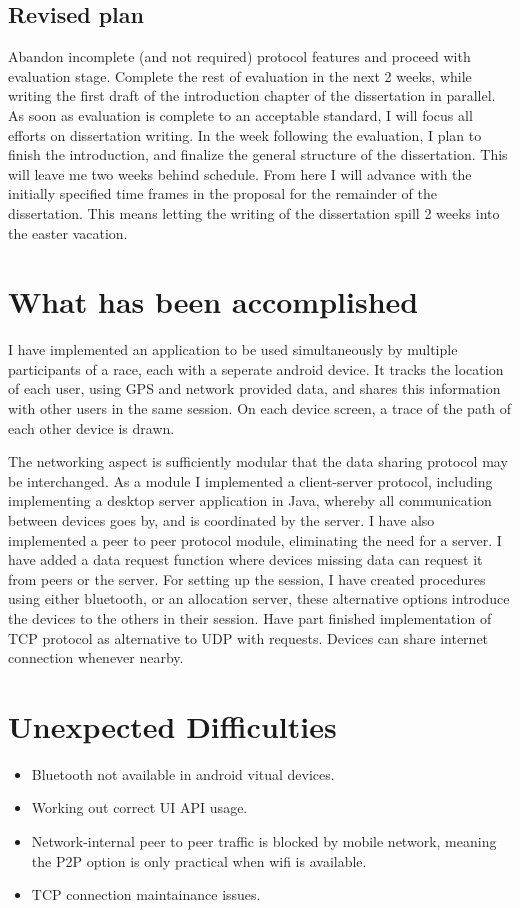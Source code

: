 \documentclass{article}
\begin{document}
\subsection*{Revised plan}
Abandon incomplete (and not required) protocol features and proceed with evaluation stage.
Complete the rest of evaluation in the next 2 weeks, while writing the first draft of the introduction chapter of the dissertation in parallel.
As soon as evaluation is complete to an acceptable standard, I will focus all efforts on dissertation writing.
In the week following the evaluation, I plan to finish the introduction, and finalize the general structure of the dissertation.
This will leave me two weeks behind schedule.
From here I will advance with the initially specified time frames in the proposal for the remainder of the dissertation. This means letting the writing of the dissertation spill 2 weeks into the easter vacation.

\section*{What has been accomplished}

I have implemented an application to be used simultaneously by multiple participants of a race, each with a seperate android device. It tracks the location of each user, using GPS and network provided data, and shares this information with other users in the same session. On each device screen, a trace of the path of each other device is drawn.

The networking aspect is sufficiently modular that the data sharing protocol may be interchanged. As a module I implemented a client-server protocol, including implementing a desktop server application in Java, whereby all communication between devices goes by, and is coordinated by the server.
I have also implemented a peer to peer protocol module, eliminating the need for a server.
I have added a data request function where devices missing data can request it from peers or the server.
For setting up the session, I have created procedures using either bluetooth, or an allocation server, these alternative options introduce the devices to the others in their session.
Have part finished implementation of TCP protocol as alternative to UDP with requests.
Devices can share internet connection whenever nearby.

\section*{Unexpected Difficulties}
\begin{itemize}
\item{Bluetooth not available in android vitual devices.}
\item{Working out correct UI API usage.}
\item{Network-internal peer to peer traffic is blocked by mobile network, meaning the P2P option is only practical when wifi is available.}
\item{TCP connection maintainance issues.}
\end{itemize}
\end{document}
